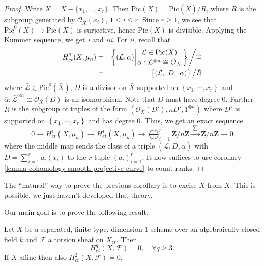 \begin{proof}
Write $X = \bar X - \{ x_1, \dots, x_r\}$. Then $\text{Pic}(X) =
\text{Pic}(\bar X)/ R$, where $R$ is the subgroup generated by
$\mathcal{O}_{\bar X}(x_i)$, $1 \leq i \leq r$. Since $r \geq 1$, we see that
$\text{Pic}^0(X) \to \text{Pic}(X)$ is surjective, hence $\text{Pic}(X)$ is
divisible. Applying the Kummer sequence, we get {\it i} and {\it iii}. For {\it
ii}, recall that
\begin{eqnarray*}
H_{et}^1(X, \mu_n) & = &
\left\{
{(\mathcal L, \alpha) {\bigg |} {{\mathcal L \in \text{Pic}(X) }
\atop
{\alpha: \mathcal L^{\otimes n} \cong \mathcal{O}_X}}}
\right\}
{\bigg /} {\cong} \\
& = &
\left\{(\bar{\mathcal L}, \ D, \ \bar \alpha) \right\} {\big /} \tilde{R}
\end{eqnarray*}
where $\bar{\mathcal L} \in \text{Pic}^0(\bar X)$, $D$ is a divisor on $\bar X$
supported on $\left\{x_1, \cdots, x_r\right\}$ and $ \bar{\alpha}:
\bar{\mathcal L}^{\otimes n} \cong \mathcal{O}_{\bar{X}}(D)$ is an isomorphism.
Note that $D$ must have degree 0. Further $\tilde{R}$ is the subgroup of
triples of the form $(\mathcal{O}_{\bar X}(D'), n D', 1^{\otimes n})$ where
$D'$ is supported on $\left\{x_1, \cdots, x_r\right\}$ and has degree 0. Thus,
we get an exact sequence
$$
0 \longrightarrow
H_{et}^1(\bar X, \mu_n) \longrightarrow
H_{et}^1(X, \mu_n) \longrightarrow
\bigoplus_{i=1}^r \mathbf{Z}/n\mathbf{Z}
\xrightarrow{\ \sum\ }
\mathbf{Z}/n\mathbf{Z} \longrightarrow 0
$$
where the middle map sends the class of a triple $(\bar{ \mathcal L}, D, \bar
\alpha)$ with $D = \sum_{i=1}^r a_i (x_i)$ to the $r$-tuple $(a_i)_{i=1}^r$. It
now suffices to use corollary \ref{lemma-cohomology-smooth-projective-curve} to
count ranks.
\end{proof}

\begin{remark}
\label{remark-natural-proof}
The ``natural'' way to prove the previous corollary is to excise $X$ from $\bar
X$. This is possible, we just haven't developed that theory.
\end{remark}

\noindent
Our main goal is to prove the following result.

\begin{theorem}
\label{theorem-vanishing-curves}
Let $X$ be a separated, finite type, dimension $1$ scheme over an algebraically
closed field $k$ and $\mathcal{F}$ a torsion sheaf on $X_{et}$. Then
$$
H_{et}^q(X, \mathcal{F}) = 0, \quad \forall q\geq 3.
$$
If $X$ affine then also $H_{et}^2(X, \mathcal{F}) = 0$.
\end{theorem}	

